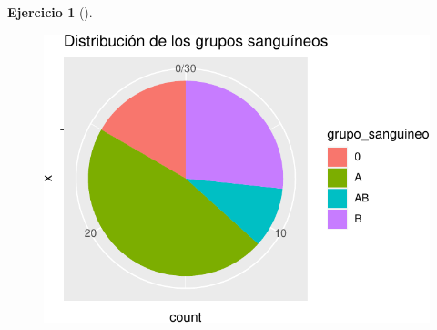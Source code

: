 \documentclass[
  a4paper,
]{scrreport}
\theoremstyle{definition}
\newtheorem{exercise}{Ejercicio}[chapter]
\theoremstyle{remark}
\begin{document}
\begin{exercise}[]
\begin{tcolorbox}
\begin{figure}[H]

{\centering \includegraphics{./03-frecuencias-graficos_files/figure-pdf/unnamed-chunk-27-1.pdf}

}

\end{figure}

\end{tcolorbox}

\end{exercise}
\end{document}
